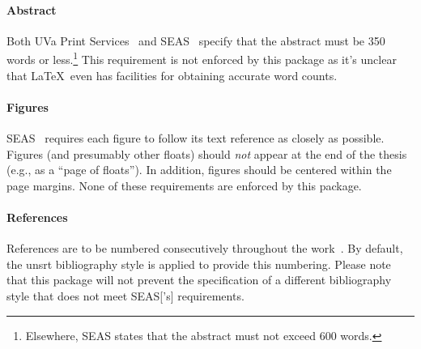 \documentclass[10pt]{article}
\begin{document}
\paragraph{Abstract}
Both \Gls{UVa} Print Services~\cite{uvaprint:thesis} and \gls{SEAS}~\cite{seas:instructions} specify that the abstract must be 350 words or less.\footnote{
  Elsewhere, \gls{SEAS} states that the abstract must not exceed 600 words.
}
This requirement is not enforced by this package as it's unclear that \LaTeX\ even has facilities for obtaining accurate word counts.

\paragraph{Figures}
\Gls{SEAS}~\cite{seas:instructions} requires each figure to follow its text reference as closely as possible.
Figures (and presumably other floats) should \emph{not} appear at the end of the thesis (e.g., as a ``page of floats'').
In addition, figures should be centered within the page margins.
None of these requirements are enforced by this package.

\paragraph{References}
References are to be numbered consecutively throughout the work~\cite{seas:instructions}.
By default, the unsrt bibliography style is applied to provide this numbering.
Please note that this package will not prevent the specification of a different bibliography style that does not meet \gls{SEAS}['s] requirements. 



\end{document}
